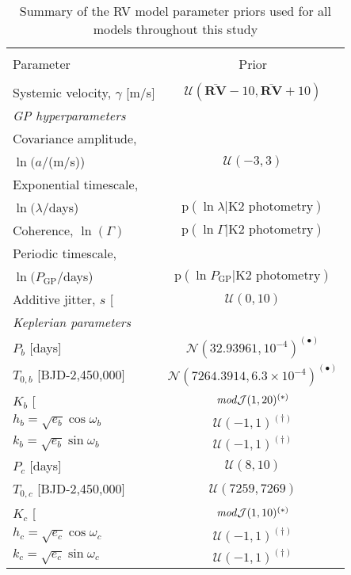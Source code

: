 \begin{table*}
\small
\renewcommand{\arraystretch}{0.7}
\centering
\caption{Summary of the RV model parameter priors used for all models throughout this study}
\label{k2182table:priors}
\begin{tabular}{lc}
\hline \\ [-1ex]
Parameter & Prior \smallskip \\
\hline \\ [-1ex]
Systemic velocity, $\gamma$ [m/s] & $\mathcal{U}(\bar{\mathbf{RV}}-10, \bar{\mathbf{RV}}+10)$ \smallskip \\
\emph{GP hyperparameters} & \\
Covariance amplitude, & \\
$\ln{(a/}$(m/s)) & $\mathcal{U}(-3,3)$ \\
Exponential timescale, & \\
$\ln{(\lambda/}$days) & $\text{p}(\ln{\lambda}|\text{K2 photometry})$ \\
Coherence, $\ln{(\Gamma)}$ & $\text{p}(\ln{\Gamma}|\text{K2 photometry})$ \\
Periodic timescale, & \\
$\ln{(P_{\text{GP}}/}$days) & $\text{p}(\ln{P_{\text{GP}}}|\text{K2 photometry})$  \\
Additive jitter, $s$ [\mps{]} & $\mathcal{U}(0,10)$ \smallskip \\
\emph{Keplerian parameters} & \\
$P_b$ [days] & $\mathcal{N}(32.93961,10^{-4})^{(\bullet)}$ \\
$T_{0,b}$ [BJD-2,450,000] & $\mathcal{N}(7264.3914,6.3 \times 10^{-4})^{(\bullet)}$ \\
$K_b$ [\mps{]} & $\text{\emph{mod}}\mathcal{J}(1,20)^{(\ast)}$ \\
$h_b = \sqrt{e_b}\cos{\omega_b}$ & $\mathcal{U}(-1,1)^{(\dagger)}$ \\
$k_b = \sqrt{e_b}\sin{\omega_b}$ & $\mathcal{U}(-1,1)^{(\dagger)}$ \\
$P_c$ [days] & $\mathcal{U}(8,10)$ \\
$T_{0,c}$ [BJD-2,450,000] & $\mathcal{U}(7259,7269)$ \\
$K_c$ [\mps{]} & $\text{\emph{mod}}\mathcal{J}(1,10)^{(\ast)}$ \\
$h_c = \sqrt{e_c}\cos{\omega_c}$ & $\mathcal{U}(-1,1)^{(\dagger)}$ \\
$k_c = \sqrt{e_c}\sin{\omega_c}$ & $\mathcal{U}(-1,1)^{(\dagger)}$ \medskip \\
\hline
\end{tabular}

\end{table*}
